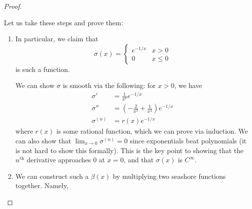 \documentclass{article}
\numberwithin{equation}{section}
\begin{document}
\begin{proof}
\begin{enumerate}
    \end{enumerate}
    Let us take these steps and prove them: 
    \begin{enumerate}
        \item In particular, we claim that \begin{equation}
            \sigma(x) = \begin{cases}
                e^{-1/x} & x > 0 \\ 
                0 & x \le 0
            \end{cases}
        \end{equation}
        is such a function.
        \begin{center}
        \end{center}
        We can show $\sigma$ is smooth via the following: for $x>0$, we have
        \begin{align}
            \sigma' &= \frac{1}{x^2}e^{-1/x} \\ 
            \sigma'' &= \left(-\frac{2}{x^3}+\frac{1}{x^4}\right)e^{-1/x} \\ 
            \sigma^{(n)} &= r(x)e^{-1/x}
        \end{align}
        where $r(x)$ is some rational function, which we can prove via induction. We can also show that $\lim_{x\to 0} \sigma^{(n)} = 0$ since exponentials beat polynomials (it is not hard to show this formally). This is the key point to showing that the $n^\text{th}$ derivative approaches $0$ at $x=0$, and that $\sigma(x)$ is $C^\infty.$
        \item We can construct such a $\beta(x)$ by multiplying two seashore functions together. Namely,

\end{enumerate}
\end{proof}
\end{document}
